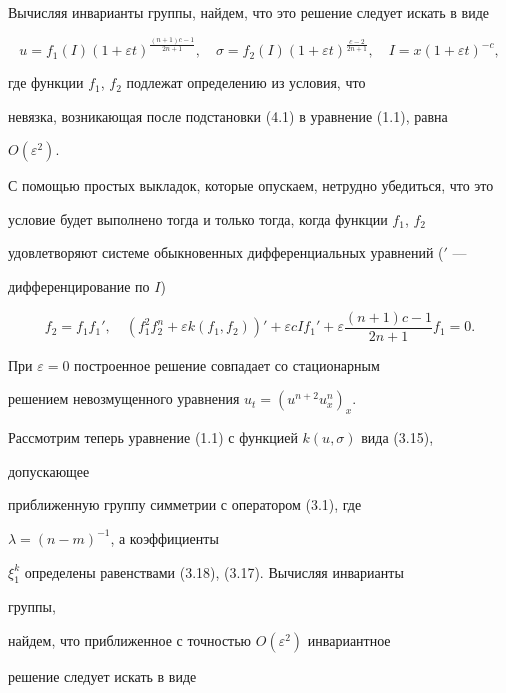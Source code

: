 Вычисляя инварианты группы, найдем, что это решение следует искать в виде


\begin{equation}


u=f_1(I)(1+\varepsilon t)^{\frac{(n+1)c-1}{2n+1}},\quad


\sigma=f_2(I)(1+\varepsilon t)^{\frac{c-2}{2n+1}},\quad


I=x(1+\varepsilon t)^{-c},


\tag{4.1}


\end{equation}


где функции $f_1$, $f_2$ подлежат определению из условия, что


невязка, возникающая после подстановки (4.1) в уравнение (1.1), равна


$O(\varepsilon^2)$.


С помощью простых выкладок, которые опускаем, нетрудно убедиться, что это


условие  будет выполнено тогда и только тогда, когда функции $f_1$, $f_2$


удовлетворяют системе обыкновенных дифференциальных уравнений (${}'$ ---


дифференцирование по $I$)


$$


f_2=f_1f_1',\quad (f^2_1f^n_2+\varepsilon k(f_1,f_2))'+


\varepsilon cIf_1'+\varepsilon


\frac{(n+1)c-1}{2n+1}f_1=0.


$$


При $\varepsilon=0$ построенное решение совпадает со стационарным


решением невозмущенного уравнения $u_t=(u^{n+2}u^n_x)_x$.





Рассмотрим теперь уравнение (1.1) с функцией $k(u,\sigma)$ вида (3.15),


допускающее


приближенную группу симметрии с оператором (3.1), где


$\lambda=(n-m)^{-1}$, а коэффициенты


$\xi^k_1$ определены равенствами (3.18), (3.17). Вычисляя инварианты


группы,


найдем, что приближенное с точностью $O(\varepsilon^2)$ инвариантное


решение следует искать в виде



